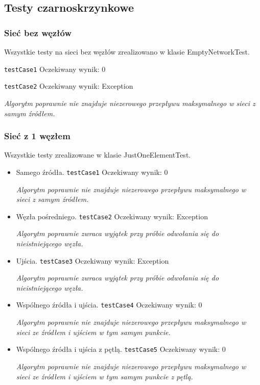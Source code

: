 \subsection{Testy czarno\dywiz skrzynkowe}


\subsubsection{Sieć bez węzłów}
Wszystkie testy na sieci bez węzłów zrealizowano w klasie EmptyNetworkTest.

\texttt{testCase1}
Oczekiwany wynik: 0

\texttt{testCase2}
Oczekiwany wynik: Exception

\emph{Algorytm poprawnie nie znajduje niezerowego przepływu maksymalnego w sieci
z samym źródłem.}

\subsubsection{Sieć z 1 węzłem}
Wszystkie testy zrealizowane w klasie JustOneElementTest.
\begin{itemize}[nosep]
    \item Samego źródła.
    \texttt{testCase1}
    Oczekiwany wynik: 0

    \emph{Algorytm poprawnie nie znajduje niezerowego przepływu maksymalnego w sieci
    z samym źródłem.}

    \item Węzła pośredniego.
    \texttt{testCase2}
    Oczekiwany wynik: Exception

    \emph{Algorytm poprawnie zwraca wyjątek przy próbie odwołania się
    do nieistniejącego węzła.}

    \item Ujścia.
    \texttt{testCase3}
    Oczekiwany wynik: Exception

    \emph{Algorytm poprawnie zwraca wyjątek przy próbie odwołania się
    do nieistniejącego węzła.}

    \item Wspólnego źródła i ujścia.
    \texttt{testCase4}
    Oczekiwany wynik: 0

    \emph{Algorytm poprawnie nie znajduje niezerowego
    przepływu maksymalnego w sieci ze źródłem i ujściem w tym samym punkcie.}

    \item Wspólnego źródła i ujścia z pętlą.
    \texttt{testCase5}
    Oczekiwany wynik: 0

    \emph{Algorytm poprawnie nie znajduje niezerowego
    przepływu maksymalnego w sieci ze źródłem i ujściem w tym samym punkcie z pętlą.}
\end{itemize}


